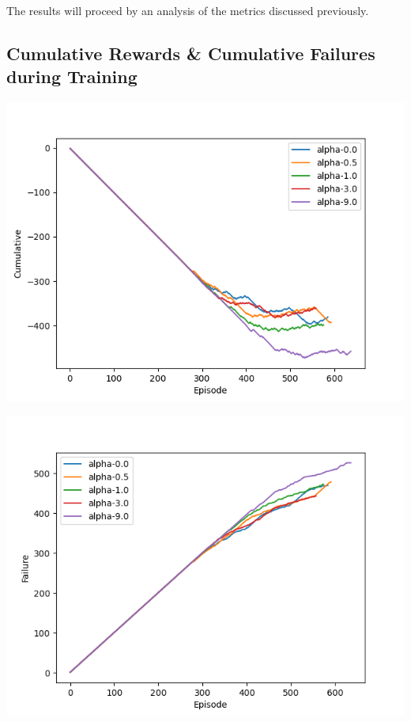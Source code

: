 The results will proceed by an analysis of the metrics discussed previously. 

\subsection{Cumulative Rewards \& Cumulative Failures during Training}

    \begin{minipage}{.5\textwidth}
      \centering
        \includegraphics[width=1.1\linewidth]{figures/cumulative-minimal.png}
        \label{fig:cumulativeminimal}
    \end{minipage} %
    \begin{minipage}{.5\textwidth}
        \centering
        \includegraphics[width=1.1\linewidth]{figures/failures-minimal.png}
        \label{fig:failuresminimal}
    \end{minipage}



